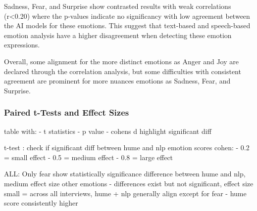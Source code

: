 Sadness, Fear, and Surprise show contrasted results with weak correlations (r<0.20) where the p-values indicate no significancy with low agreement between the AI models for these emotions. 
This suggest that text-based and speech-based emotion analysis have a higher disagreement when detecting these emotion expressions. 

Overall, some alignment for the more distinct emotions as Anger and Joy are declared through the correlation analysis, but some difficulties with consistent agreement are prominent for more nuances emotions as Sadness, Fear, and Surprise. 

\subsubsection{Paired t-Tests and Effect Sizes}
table with: 
- t statistics 
- p value 
- cohens d 
highlight significant diff 

t-test : check if significant diff between hume and nlp emotion scores 
cohen: - 0.2 = small effect
- 0.5 = medium effect
- 0.8 = large effect

ALL: 
Only fear show statistically significance difference between hume and nlp, medium effect size 
other emotions - differences exist but not significant, effect size small 
= across all interviews, hume + nlp generally align except for fear - hume score consistently higher 



